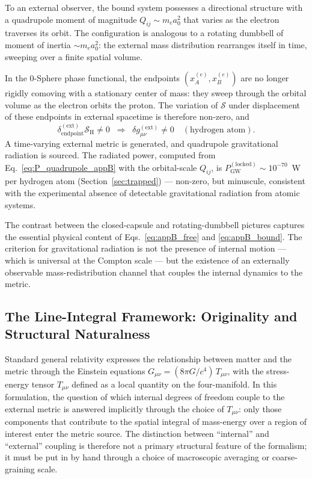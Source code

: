 \documentclass[%
 reprint, amsmath,amssymb, aps, prd, ]{revtex4-2}
\numberwithin{equation}{section}
\begin{document}
To an external observer, the bound system possesses a directional structure with a quadrupole moment of magnitude $Q_{ij} \sim m_e a_0^2$ that varies as the electron traverses its orbit.
The configuration is analogous to a rotating dumbbell of moment of inertia $\sim m_e a_0^2$: the external mass distribution rearranges itself in time, sweeping over a finite spatial volume.

In the 0-Sphere phase functional, the endpoints $(x_A^{(e)}, x_B^{(e)})$ are no longer rigidly comoving with a stationary center of mass: they sweep through the orbital volume as the electron orbits the proton.
The variation of $\mathcal{S}$ under displacement of these endpoints in external spacetime is therefore non-zero, and
\begin{equation}
\delta_{\mathrm{endpoint}}^{(\mathrm{ext})}\mathcal{S}_{\mathrm{H}} \neq 0
\;\;\Longrightarrow\;\;
\delta g_{\mu\nu}^{(\mathrm{ext})} \neq 0
\quad (\text{hydrogen atom}).
\label{eq:appB_bound}
\end{equation}
A time-varying external metric is generated, and quadrupole gravitational radiation is sourced.
The radiated power, computed from Eq.~\eqref{eq:P_quadrupole_appB} with the orbital-scale $Q_{ij}$, is $P_{\mathrm{GW}}^{(\mathrm{locked})} \sim 10^{-70}$~W per hydrogen atom (Section~\ref{sec:trapped}) --- non-zero, but minuscule, consistent with the experimental absence of detectable gravitational radiation from atomic systems.

The contrast between the closed-capsule and rotating-dumbbell pictures captures the essential physical content of Eqs.~\eqref{eq:appB_free} and \eqref{eq:appB_bound}.
The criterion for gravitational radiation is not the presence of internal motion --- which is universal at the Compton scale --- but the existence of an externally observable mass-redistribution channel that couples the internal dynamics to the metric.

\subsection{The Line-Integral Framework: Originality and Structural Naturalness}

Standard general relativity expresses the relationship between matter and the metric through the Einstein equations $G_{\mu\nu} = (8\pi G/c^4)\,T_{\mu\nu}$, with the stress-energy tensor $T_{\mu\nu}$ defined as a local quantity on the four-manifold.
In this formulation, the question of which internal degrees of freedom couple to the external metric is answered implicitly through the choice of $T_{\mu\nu}$: only those components that contribute to the spatial integral of mass-energy over a region of interest enter the metric source.
The distinction between ``internal'' and ``external'' coupling is therefore not a primary structural feature of the formalism; it must be put in by hand through a choice of macroscopic averaging or coarse-graining scale.
\end{document}
